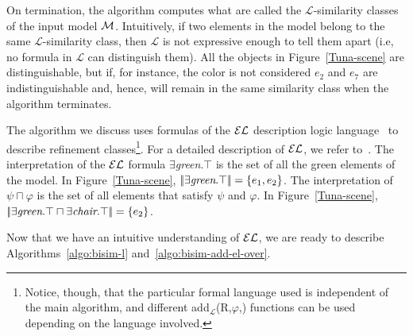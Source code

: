 On termination, the algorithm computes what are called the $\mathcal{L}$-similarity classes of the input model $\mathcal{M}$. Intuitively, if two elements in the model belong to the same $\mathcal{L}$-similarity class, then $\mathcal{L}$ is not expressive enough to tell them apart (i.e, no formula in $\mathcal{L}$ can distinguish them). All the objects in Figure~\ref{Tuna-scene} are distinguishable, but if, for instance, the color is not considered $e_2$ and $e_7$ are indistinguishable and, hence, will remain in the same similarity class when the algorithm terminates. 

The algorithm we discuss uses formulas of the $\mathcal{EL}$ description logic language~\cite{baad:desc03} to describe refinement classes\footnote{Notice, though, that the particular formal language used is independent of the main algorithm, and different add$_{\mathcal{L}}$(R,$\varphi$,\RE) functions can be used depending on the language involved.}. For a detailed description of $\mathcal{EL}$, we refer to~\cite{baad:desc03}.  
The interpretation of the $\mathcal{EL}$ formula $\exists$\emph{green}.$\top$ is the set of all the green elements of the model. In Figure~\ref{Tuna-scene}, $\interp{\exists$\emph{green}.$\top}=\{e_1,e_2\}$. The interpretation of $\psi \sqcap \varphi$ is the set of all elements that satisfy $\psi$ and $\varphi$. In Figure~\ref{Tuna-scene}, $\interp{\exists$\emph{green}.$\top \sqcap \exists$\emph{chair}.$\top}=\{e_2\}$.

Now that we have an intuitive understanding of $\mathcal{EL}$, we are ready to describe Algorithms~\ref{algo:bisim-l} and~\ref{algo:bisim-add-el-over}. 


